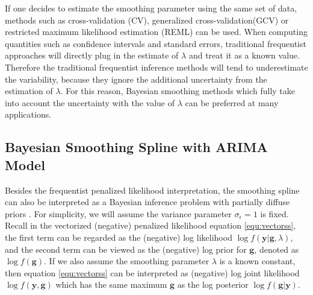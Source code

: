 \documentclass{article}
\begin{document}
If one decides to estimate the smoothing parameter using the same set of data, methods such as cross-validation (CV), generalized cross-validation(GCV) or restricted maximum likelihood estimation (REML) can be used. When computing quantities such as confidence intervals and standard errors, traditional frequentist approaches will directly plug in the estimate of $\lambda$ and treat it as a known value. Therefore the traditional frequentist inference methods will tend to underestimate the variability, because they ignore the additional uncertainty from the estimation of $\lambda$. For this reason, Bayesian smoothing methods which fully take into account the uncertainty with the value of $\lambda$ can be preferred at many applications.










\subsection{Bayesian Smoothing Spline with ARIMA Model}\label{ARIMA}

Besides the frequentist penalized likelihood interpretation, the smoothing spline can also be interpreted as a Bayesian inference problem with partially diffuse priors \citep{ARIMA}. For simplicity, we will assume the variance parameter $\sigma_\epsilon = 1$ is fixed.
Recall in the vectorized (negative) penalized likelihood equation \ref{equ:vectorss}, the first term can be regarded as the (negative) log likelihood $\log f(\boldsymbol{y}|\boldsymbol{g},\lambda)$, and the second term can be viewed as the (negative) log prior for $\boldsymbol{g}$, denoted as $\log f(\boldsymbol{g})$. If we also assume the smoothing parameter $\lambda$ is a known constant, then equation \ref{equ:vectorss} can be interpreted as (negative) log joint likelihood $\log f(\boldsymbol{y},\boldsymbol{g})$ which has the same maximum $\hat{\boldsymbol{g}}$ as the log posterior $\log f(\boldsymbol{g}|\boldsymbol{y})$.
\end{document}
